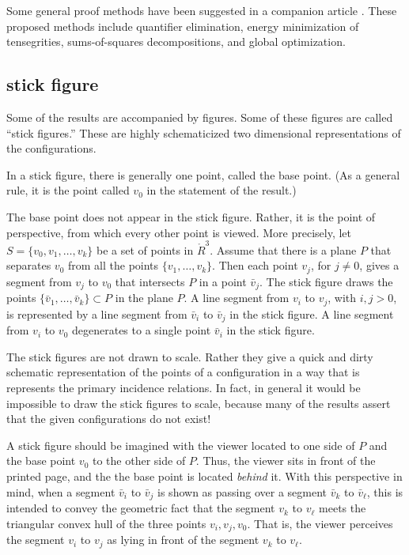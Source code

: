 Some general proof methods have been suggested
in a companion article \cite{method}.  These proposed methods include
quantifier elimination, energy minimization of tensegrities,
sums-of-squares decompositions, and global optimization.  


\subsection{stick figure}

Some of the results are accompanied by figures.  Some of these
figures are called ``stick figures.'' These are highly schematicized
two dimensional representations of the configurations.

In a stick figure, there is generally one point, called the
base point.  (As a general rule, it is the point called $v_0$ in
the statement of the result.) 

The base point does not appear in the stick figure.  Rather, it
is the point of perspective, from which every other point is viewed.
More precisely, let $S=\{v_0,v_1,\ldots,v_k\}$ be a set of points
in $\ring{R}^3$.  Assume that there is a plane $P$ that separates
$v_0$ from all the points $\{v_1,\ldots,v_k\}$.  Then each point
$v_j$, for $j\ne 0$, gives a segment from $v_j$ to $v_0$ that intersects
$P$ in a point $\bar v_j$.  The stick figure draws the points
$\{\bar v_1,\ldots ,\bar v_k\}\subset P$ in the plane $P$.
A line segment from $v_i$ to $v_j$, with $i,j>0$, is represented by a
line segment from $\bar v_i$ to $\bar v_j$ in the stick figure.
A line segment from $v_i$ to $v_0$ degenerates to a single point $\bar v_i$
in the stick figure.

The stick figures are not drawn to scale.  Rather they give
a quick and dirty schematic representation of the points of a configuration
in a way that is represents the primary incidence relations.
In fact, in general it would be impossible to draw the stick figures
to scale, because many of the results assert that the given
configurations do not exist!

A stick figure should be imagined with the viewer located to one
side of $P$ and the base point $v_0$ to the other side of $P$.  Thus,
the viewer sits in front of the printed page, and the
the base point is located {\it behind} it.  With
this perspective in mind, 
when a segment $\bar v_i$ to $\bar v_j$ is shown as
passing over a segment $\bar v_k$ to $\bar v_\ell$, this is intended
to convey the geometric fact that the segment $v_k$ to $v_\ell$ meets
the triangular convex hull of the three points $v_i,v_j,v_0$.  That
is, the viewer perceives the segment $v_i$ to $v_j$ as lying in front
of the segment $v_k$ to $v_\ell$.

